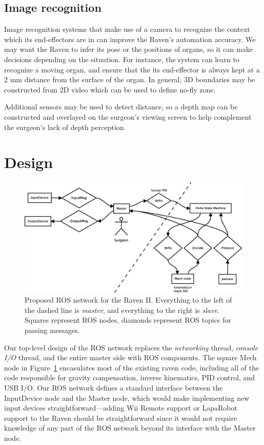 \documentclass[letterpaper,twocolumn,10pt]{article}
\begin{document}
\subsection{Image recognition}
Image recognition systems that make use of a camera to recognize the
context which its end-effectors are in can improve the Raven's
automation accuracy. We may want the Raven to infer its pose or the
positions of organs, so it can make decisions depending on the
situation. For instance, the system can learn to recognize a moving
organ, and ensure that the its end-effector is always kept at a 2 mm
distance from the surface of the organ. In general, 3D boundaries may
be constructed from 2D video which can be used to define no-fly zone.

Additional sensors may be used to detect distance, so a depth map
can be constructed and overlayed on the surgeon's viewing screen to
help complement the surgeon's lack of depth perception.

\section{Design}

\begin{figure}[t]
  \begin{center}
    \includegraphics[width=1.0\textwidth]{ros_high_level_v2.eps}
  \end{center}
  \caption{Proposed ROS network for the Raven II. Everything to the
    left of the dashed line is \emph{master}, and everything to the
    right is \emph{slave}. Squares represent ROS nodes, diamonds
    represent ROS topics for passing messages.}
  \label{fig:ros_network}
\end{figure}

Our top-level design of the ROS network replaces the \emph{networking}
thread, \emph{console I/O} thread, and the entire master side with ROS
components. The square Mech node in Figure~\ref{fig:ros_network}
encasulates most of the existing raven code, including all of the code
responsible for gravity compensation, inverse kinematics, PID control,
and USB I/O. Our ROS network defines a standard interface between the
InputDevice node and the Master node, which would make implementing
new input devices straightforward---adding Wii Remote support or
LapaRobot support to the Raven should be straightforward since it
would not require knowledge of any part of the ROS network beyond its
interface with the Master node.
\end{document}
